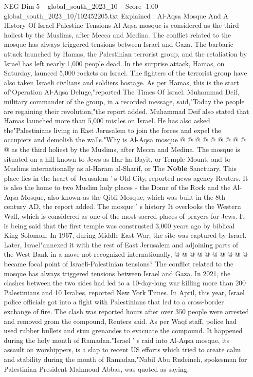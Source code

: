 \begin{textsample}{NEG Dim 5 – global\_south\_2023\_10 – Score -1.00 – global\_south\_2023\_10/102452205.txt}  \label{ex:f5_neg_096}
Explained : Al-Aqsa Mosque And A History Of Israel-Palestine Tensions Al-Aqsa mosque is considered as the third holiest by the Muslims, after Mecca and Medina.
The conflict related to the mosque has always triggered tensions between Israel and Gaza.
The barbaric attack launched by Hamas, the Palestinian terrorist group, and the retaliation by Israel has left nearly 1,000 people dead.
In the surprise attack, Hamas, on Saturday, launced 5,000 rockets on Israel.
The fighters of the terrorist group have also taken Israeli civilians and soldiers hostage.
As per Hamas, this is the start of"Operation Al-Aqsa Deluge,"reported The Times Of Israel.
Muhammad Deif, military commander of the group, in a recorded message, said,"Today the people are regaining their revolution,"the report added.
Muhammad Deif also stated that Hamas launched more than 5,000 misiles on Israel.
He has also asked the"Palestinians living in East Jerusalem to join the forces and expel the occupiers and demolish the walls."Why is Al-Aqsa mosque @ @ @ @ @ @ @ @ @ @ as the third holiest by the Muslims, after Mecca and Medina.
The mosque is situated on a hill known to Jews as Har ha-Bayit, or Temple Mount, and to Muslims internationally as al-Haram al-Sharif, or The \textbf{Noble} Sanctuary.
This place lies in the heart of Jerusalem ' s Old City, reported news agency Reuters.
It is also the home to two Muslim holy places - the Dome of the Rock and the Al-Aqsa Mosque, also known as the Qibli Mosque, which was built in the 8th century AD, the report added.
The mosque ' s history It overlooks the Western Wall, which is considered as one of the most sacred places of prayers for Jews.
It is being said that the first temple was construsted 3,000 years ago by biblical King Solomon.
In 1967, during Middle East War, the site was captured by Israel.
Later, Israel"annexed it with the rest of East Jerusalem and adjoining parts of the West Bank in a move not recognized internationally, @ @ @ @ @ @ @ @ @ @ became focal point of Israeli-Palestinian tensions?
The conflict related to the mosque has always triggered tensions between Israel and Gaza.
In 2021, the clashes between the two sides had led to a 10-day-long war killing more than 200 Palestinians and 10 Isralies, reported New York Times.
In April, this year, Israel police officials got into a fight with Palestinians that led to a cross-border exchange of fire.
The clash was reported hours after over 350 people were arrested and removed grom the compound, Reuters said.
As per Waqf staff, police had used rubber bullets and stun grenandes to evacuate the compound.
It happened during the holy month of Ramadan."Israel ' s raid into Al-Aqsa mosque, its assault on worshippers, is a slap to recent US efforts which tried to create calm and stability during the month of Ramadan,"Nabil Abu Rudeineh, spokesman for Palestinian President Mahmoud Abbas, was quoted as saying.

\end{textsample}
